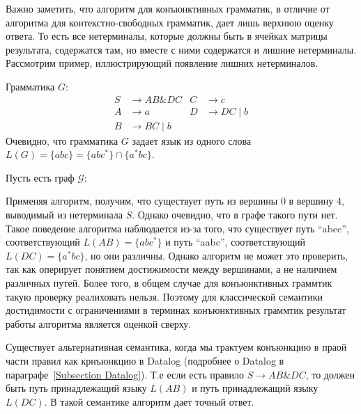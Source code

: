 Важно заметить, что алгоритм для конъюнктивных грамматик, в отличие от алгоритма для контекстно-свободных грамматик, дает лишь верхнюю оценку ответа. То есть все нетерминалы, которые должны быть в ячейках матрицы результата, содержатся там, но вместе с ними содержатся и лишние нетерминалы. Рассмотрим пример, иллюстрирующий появление лишних нетерминалов.

\begin{example}
    Грамматика $G$:
    \begin{align*}
    S &\to AB \& DC & C &\to c \\ 
    A &\to a        & D &\to DC \mid b\\
    B &\to BC \mid b
    \end{align*}
    Очевидно, что грамматика $G$ задает язык из одного слова $L(G) = \{abc\} = \{abc^*\} \cap \{a^* bc\}$.
    
    Пусть есть граф $\mathcal{G}$:
    \begin{center}
    \end{center}
    Применяя алгоритм, получим, что существует путь из вершины 0 в вершину 4, выводимый из нетерминала $S$. Однако очевидно, что в графе такого пути нет. 
    Такое поведение алгоритма наблюдается из-за того, что существует путь ``abcc'', соответствующий $L(AB) = \{abc^*\}$ и путь ``aabc'', соответствующий $L(DC) = \{a^{*}bc\}$, но они различны. Однако алгоритм не может это проверить, так как оперирует понятием достижимости между вершинами, а не наличием различных путей. Более того, в общем случае для конъюнктивных граммтик такую проверку реалиховать нельзя. Поэтому для классической семантики достидимости с ограничениями в терминах конъюнктивных граммтик результат работы алгоритма является оценкой сверху.
    
    Существует альтернативная семантика, когда мы трактуем конъюнкцию в праой части правил как крнъюнкцию в Datalog (подробнее о Datalog в параграфе~\ref{Subsection Datalog}). Т.е если есть правило $S \to AB \& DC$, то должен быть путь принадлежащий языку $L(AB)$ и путь принадлежащий языку $L(DC)$. В такой семантике алгоритм дает точный ответ.
\end{example}

